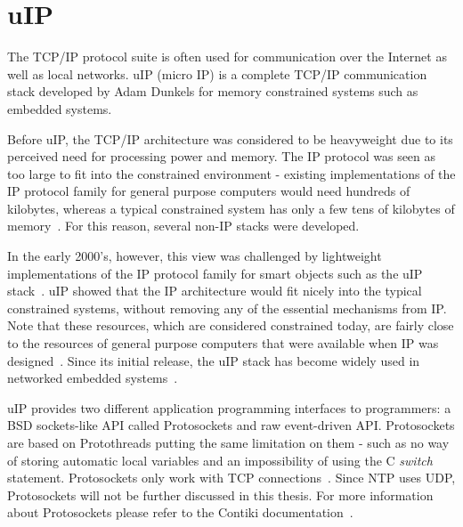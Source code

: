 
\section{uIP}\label{sec:contiki-uip}
The TCP/IP protocol suite is often used for communication over the Internet as well as local networks.
uIP (micro IP) is a complete TCP/IP communication stack developed by Adam Dunkels
for memory constrained systems such as embedded systems.

Before uIP, the TCP/IP architecture was considered to be heavyweight
due to its perceived need for processing power and memory.
The IP protocol was seen as too large to fit into the constrained environment -
existing implementations of the IP protocol family for general purpose computers would need hundreds
of kilobytes, whereas a typical constrained system has only a few tens of kilobytes of memory~\cite{interconnecting}.
For this reason, several non-IP stacks were developed.

In the early 2000's, however, this view was challenged by lightweight implementations of the IP
protocol family for smart objects such as the uIP stack~\cite{interconnecting}.
uIP showed that the IP architecture would fit nicely into the typical constrained systems,
without removing any of the essential mechanisms from IP.
Note that these resources, which are considered constrained today, are fairly close to the
resources of general purpose computers that were available when IP was designed~\cite{interconnecting}.
Since its initial release, the uIP stack has become widely used in networked
embedded systems~\cite{interconnecting, thesis-programming}.

uIP provides two different application programming interfaces to programmers:
a BSD sockets-like API called Protosockets and raw event-driven API.
Protosockets are based on Protothreads putting the same limitation on them - such as
no way of storing automatic local variables and an impossibility of using the C {\it switch} statement.
Protosockets only work with TCP connections~\cite{contiki-docs}.
Since NTP uses UDP, Protosockets will not be further
discussed in this thesis. For more information about Protosockets
please refer to the Contiki documentation~\cite{contiki-docs}.

